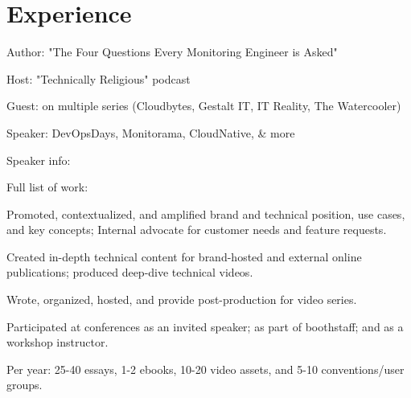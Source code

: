 \documentclass[]{deedy-resume-openfont}
\begin{document}
%
%
\begin{minipage}[t]{0.64\textwidth} 


\section{Experience}

\descript{ }
\begin{tightemize}
	\vspace{\topsep}
	\item Author: "The Four Questions Every Monitoring Engineer is Asked"
	\item Host: "Technically Religious" podcast
	\item Guest: on multiple series (Cloudbytes, Gestalt IT, IT Reality, \linebreak The Watercooler)
	\item Speaker: DevOpsDays, Monitorama, CloudNative, \& more
	\item Speaker info: \href{http://www.adatosystems.com/speaking/}{}
	\item Full list of work: \linebreak \href{http://www.adatosystems.com/articles-and-appearances/}{}
\end{tightemize}
\sectionsep

\descript{}
\begin{tightemize}
	\item Promoted, contextualized, and amplified brand and technical position, use cases, and key concepts; Internal advocate for customer needs and feature requests.
	\item Created in-depth technical content for brand-hosted and external online publications; produced deep-dive technical videos.
	\item Wrote, organized, hosted, and provide post-production for video series.
	\item Participated at conferences as an invited speaker; as part of boothstaff; and as a workshop instructor.
	\item Per year: 25-40 essays, 1-2 ebooks, 10-20 video assets, and 5-10 conventions/user groups.
\end{tightemize}
\sectionsep


\end{minipage}
\end{document}
